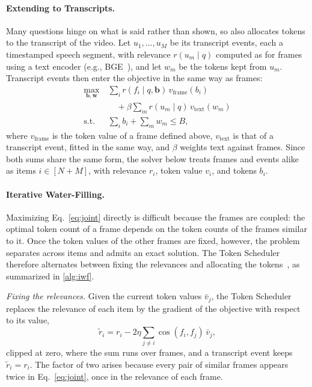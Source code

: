 \paragraph{Extending to Transcripts.}
Many questions hinge on what is said rather than shown, so \name also allocates tokens to the transcript of the video. Let $u_1,\dots,u_M$ be its transcript events, each a timestamped speech segment, with relevance $r(u_m\mid q)$ computed as for frames using a text encoder (e.g., BGE~\cite{bge}), and let $w_m$ be the tokens kept from $u_m$. Transcript events then enter the objective in the same way as frames:
\begin{equation}
\begin{aligned}
  \max_{\mathbf b,\mathbf w}\ &\sum_{i}r(f_i\mid q,\mathbf b)\,v_{\text{frame}}(b_i)\\[-2pt]
  &\quad+\beta\sum_{m}r(u_m\mid q)\,v_{\text{text}}(w_m)\\[-2pt]
  \text{s.t.}\ \ &\sum_{i}b_i+\sum_{m}w_m\le B ,
\end{aligned}
  \label{eq:joint}
\end{equation}
where $v_{\text{frame}}$ is the token value of a frame defined above, $v_{\text{text}}$ is that of a transcript event, fitted in the same way, and $\beta$ weights text against frames. Since both sums share the same form, the solver below treats frames and events alike as items $i\in[N+M]$, with relevance $r_i$, token value $v_i$, and tokens $b_i$.

\paragraph{Iterative Water-Filling.}
Maximizing Eq.~\eqref{eq:joint} directly is difficult because the frames are coupled: the optimal token count of a frame depends on the token counts of the frames similar to it. Once the token values of the other frames are fixed, however, the problem separates across items and admits an exact solution. The Token Scheduler therefore alternates between fixing the relevances and allocating the tokens~\cite{frank1956,jaggi2013}, as summarized in \cref{alg:iwf}.

\textit{Fixing the relevances.} Given the current token values $\bar v_j$, the Token Scheduler replaces the relevance of each item by the gradient of the objective with respect to its value,
\begin{equation}
  \tilde r_i=r_i-2\eta\sum_{j\ne i}\cos(f_i,f_j)\,\bar v_j ,
  \label{eq:effective}
\end{equation}
clipped at zero, where the sum runs over frames, and a transcript event keeps $\tilde r_i=r_i$. The factor of two arises because every pair of similar frames appears twice in Eq.~\eqref{eq:joint}, once in the relevance of each frame.

